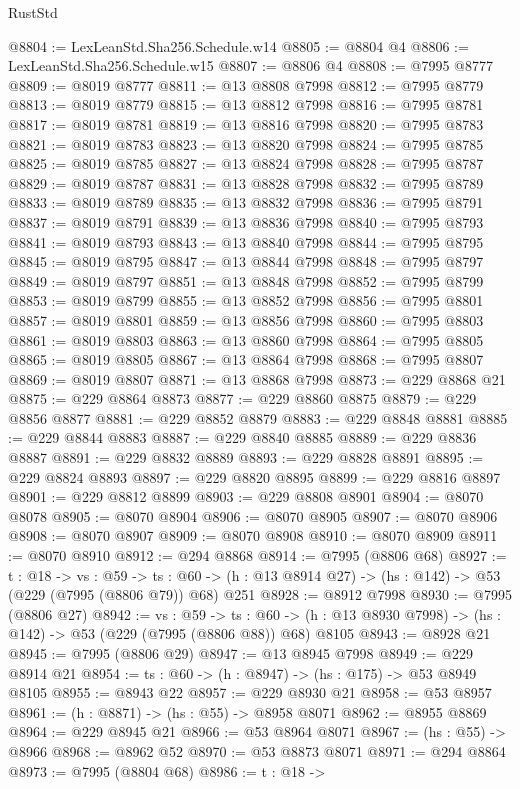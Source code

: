 \begin{lexlean}{RustStd}
\begin{coremodule}
@8804 := LexLeanStd.Sha256.Schedule.w14
@8805 := @8804 @4
@8806 := LexLeanStd.Sha256.Schedule.w15
@8807 := @8806 @4
@8808 := @7995 @8777
@8809 := @8019 @8777
@8811 := @13 @8808 @7998
@8812 := @7995 @8779
@8813 := @8019 @8779
@8815 := @13 @8812 @7998
@8816 := @7995 @8781
@8817 := @8019 @8781
@8819 := @13 @8816 @7998
@8820 := @7995 @8783
@8821 := @8019 @8783
@8823 := @13 @8820 @7998
@8824 := @7995 @8785
@8825 := @8019 @8785
@8827 := @13 @8824 @7998
@8828 := @7995 @8787
@8829 := @8019 @8787
@8831 := @13 @8828 @7998
@8832 := @7995 @8789
@8833 := @8019 @8789
@8835 := @13 @8832 @7998
@8836 := @7995 @8791
@8837 := @8019 @8791
@8839 := @13 @8836 @7998
@8840 := @7995 @8793
@8841 := @8019 @8793
@8843 := @13 @8840 @7998
@8844 := @7995 @8795
@8845 := @8019 @8795
@8847 := @13 @8844 @7998
@8848 := @7995 @8797
@8849 := @8019 @8797
@8851 := @13 @8848 @7998
@8852 := @7995 @8799
@8853 := @8019 @8799
@8855 := @13 @8852 @7998
@8856 := @7995 @8801
@8857 := @8019 @8801
@8859 := @13 @8856 @7998
@8860 := @7995 @8803
@8861 := @8019 @8803
@8863 := @13 @8860 @7998
@8864 := @7995 @8805
@8865 := @8019 @8805
@8867 := @13 @8864 @7998
@8868 := @7995 @8807
@8869 := @8019 @8807
@8871 := @13 @8868 @7998
@8873 := @229 @8868 @21
@8875 := @229 @8864 @8873
@8877 := @229 @8860 @8875
@8879 := @229 @8856 @8877
@8881 := @229 @8852 @8879
@8883 := @229 @8848 @8881
@8885 := @229 @8844 @8883
@8887 := @229 @8840 @8885
@8889 := @229 @8836 @8887
@8891 := @229 @8832 @8889
@8893 := @229 @8828 @8891
@8895 := @229 @8824 @8893
@8897 := @229 @8820 @8895
@8899 := @229 @8816 @8897
@8901 := @229 @8812 @8899
@8903 := @229 @8808 @8901
@8904 := @8070 @8078
@8905 := @8070 @8904
@8906 := @8070 @8905
@8907 := @8070 @8906
@8908 := @8070 @8907
@8909 := @8070 @8908
@8910 := @8070 @8909
@8911 := @8070 @8910
@8912 := @294 @8868
@8914 := @7995 (@8806 @68)
@8927 := {t : @18} ->
  {vs : @59} ->
  {ts : @60} -> (h : @13 @8914 @27) -> (hs : @142) -> @53 (@229 (@7995 (@8806 @79)) @68) @251
@8928 := @8912 @7998
@8930 := @7995 (@8806 @27)
@8942 := {vs : @59} ->
  {ts : @60} -> (h : @13 @8930 @7998) -> (hs : @142) -> @53 (@229 (@7995 (@8806 @88)) @68) @8105
@8943 := @8928 @21
@8945 := @7995 (@8806 @29)
@8947 := @13 @8945 @7998
@8949 := @229 @8914 @21
@8954 := {ts : @60} -> (h : @8947) -> (hs : @175) -> @53 @8949 @8105
@8955 := @8943 @22
@8957 := @229 @8930 @21
@8958 := @53 @8957
@8961 := (h : @8871) -> (hs : @55) -> @8958 @8071
@8962 := @8955 @8869
@8964 := @229 @8945 @21
@8966 := @53 @8964 @8071
@8967 := (hs : @55) -> @8966
@8968 := @8962 @52
@8970 := @53 @8873 @8071
@8971 := @294 @8864
@8973 := @7995 (@8804 @68)
@8986 := {t : @18} ->

\end{coremodule}
\end{lexlean}
